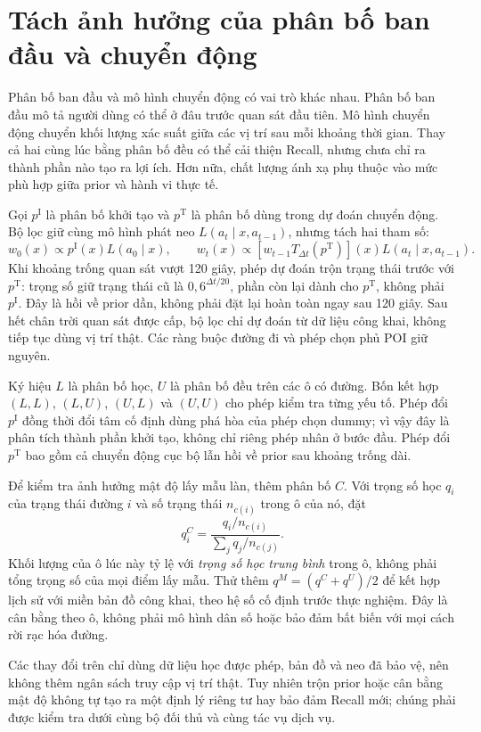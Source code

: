 \begingroup
{}
\section{Tách ảnh hưởng của phân bố ban đầu và chuyển động}
\label{sec:prior-factor-method}

Phân bố ban đầu và mô hình chuyển động có vai trò khác nhau. Phân bố ban đầu mô tả người dùng có thể ở đâu trước quan sát đầu tiên. Mô hình chuyển động chuyển khối lượng xác suất giữa các vị trí sau mỗi khoảng thời gian. Thay cả hai cùng lúc bằng phân bố đều có thể cải thiện Recall, nhưng chưa chỉ ra thành phần nào tạo ra lợi ích. Hơn nữa, chất lượng ánh xạ phụ thuộc vào mức phù hợp giữa prior và hành vi thực tế.~\citep{chatzikokolakis2017utility}

Gọi $p^{\mathrm I}$ là phân bố khởi tạo và $p^{\mathrm T}$ là phân bố dùng trong dự đoán chuyển động. Bộ lọc giữ cùng mô hình phát neo $L(a_t\mid x,a_{t-1})$, nhưng tách hai tham số:
\[
w_0(x)\propto p^{\mathrm I}(x)L(a_0\mid x),\qquad
w_t(x)\propto [w_{t-1}T_{\Delta t}(p^{\mathrm T})](x)
L(a_t\mid x,a_{t-1}).
\]
Khi khoảng trống quan sát vượt 120 giây, phép dự đoán trộn trạng thái trước với $p^{\mathrm T}$: trọng số giữ trạng thái cũ là $0{,}6^{\Delta t/20}$, phần còn lại dành cho $p^{\mathrm T}$, không phải $p^{\mathrm I}$. Đây là hồi về prior dần, không phải đặt lại hoàn toàn ngay sau 120 giây. Sau hết chân trời quan sát được cấp, bộ lọc chỉ dự đoán từ dữ liệu công khai, không tiếp tục dùng vị trí thật. Các ràng buộc đường đi và phép chọn phủ POI giữ nguyên.

Ký hiệu $L$ là phân bố học, $U$ là phân bố đều trên các ô có đường. Bốn kết hợp $(L,L)$, $(L,U)$, $(U,L)$ và $(U,U)$ cho phép kiểm tra từng yếu tố. Phép đổi $p^{\mathrm I}$ đồng thời đổi tâm cố định dùng phá hòa của phép chọn dummy; vì vậy đây là phân tích thành phần khởi tạo, không chỉ riêng phép nhân ở bước đầu. Phép đổi $p^{\mathrm T}$ bao gồm cả chuyển động cục bộ lẫn hồi về prior sau khoảng trống dài.

Để kiểm tra ảnh hưởng mật độ lấy mẫu làn, thêm phân bố $C$. Với trọng số học $q_i$ của trạng thái đường $i$ và số trạng thái $n_{c(i)}$ trong ô của nó, đặt
\[
q_i^{C}=\frac{q_i/n_{c(i)}}{\sum_j q_j/n_{c(j)}}.
\]
Khối lượng của ô lúc này tỷ lệ với \emph{trọng số học trung bình} trong ô, không phải tổng trọng số của mọi điểm lấy mẫu. Thử thêm $q^M=(q^C+q^U)/2$ để kết hợp lịch sử với miền bản đồ công khai, theo hệ số cố định trước thực nghiệm. Đây là cân bằng theo ô, không phải mô hình dân số hoặc bảo đảm bất biến với mọi cách rời rạc hóa đường.

Các thay đổi trên chỉ dùng dữ liệu học được phép, bản đồ và neo đã bảo vệ, nên không thêm ngân sách truy cập vị trí thật. Tuy nhiên trộn prior hoặc cân bằng mật độ không tự tạo ra một định lý riêng tư hay bảo đảm Recall mới; chúng phải được kiểm tra dưới cùng bộ đối thủ và cùng tác vụ dịch vụ.
\par\endgroup
